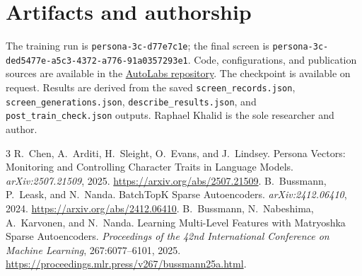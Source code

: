 \documentclass[11pt]{article}
\begin{document}
\section*{Artifacts and authorship}
The training run is \texttt{persona-3c-d77e7c1e}; the final screen is
\texttt{persona-3c-ded5477e-\allowbreak{}a5c3-\allowbreak{}4372-\allowbreak{}a776-\allowbreak{}91a0357293e1}.
Code, configurations, and publication sources are available in the
\href{https://github.com/RaphaelKhalid/autolabs/tree/main/research/experiment-003c}{AutoLabs repository}.
The checkpoint is available on request.
Results are derived from the saved \texttt{screen\_records.json},
\texttt{screen\_generations.json}, \texttt{describe\_results.json}, and
\texttt{post\_train\_check.json} outputs. Raphael Khalid is the sole researcher
and author.


\begin{thebibliography}{3}
R.~Chen, A.~Arditi, H.~Sleight, O.~Evans, and J.~Lindsey.
\newblock Persona Vectors: Monitoring and Controlling Character Traits in Language Models.
\newblock \emph{arXiv:2507.21509}, 2025.
\newblock \url{https://arxiv.org/abs/2507.21509}.
B.~Bussmann, P.~Leask, and N.~Nanda.
\newblock BatchTopK Sparse Autoencoders.
\newblock \emph{arXiv:2412.06410}, 2024.
\newblock \url{https://arxiv.org/abs/2412.06410}.
B.~Bussmann, N.~Nabeshima, A.~Karvonen, and N.~Nanda.
\newblock Learning Multi-Level Features with Matryoshka Sparse Autoencoders.
\newblock \emph{Proceedings of the 42nd International Conference on Machine Learning},
267:6077--6101, 2025.
\newblock \url{https://proceedings.mlr.press/v267/bussmann25a.html}.
\end{thebibliography}
\end{document}
